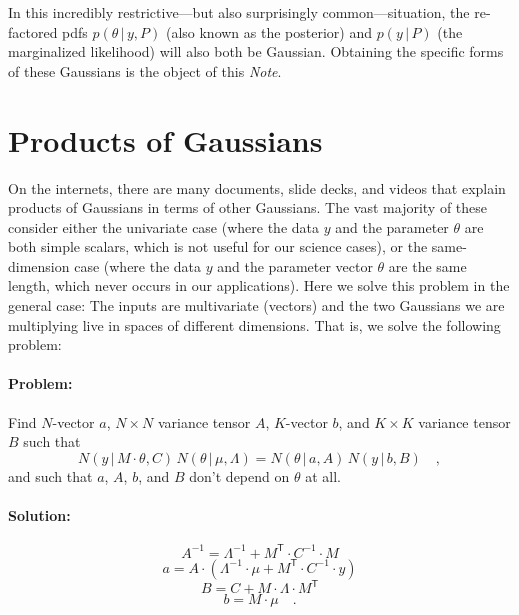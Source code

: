 \documentclass[12pt, letterpaper]{article}
\newcommand{\documentname}{\textsl{Note}}
\newcommand{\given}{\,|\,}
\newcommand{\T}{^{\!\mathsf{T}}}
\newcommand{\inv}{^{-1}}
\begin{document}
In this incredibly restrictive---but also surprisingly
common---situation, the re-factored pdfs $p(\theta\given y, P)$ (also
known as the posterior) and $p(y\given P)$ (the marginalized
likelihood) will also both be Gaussian.
Obtaining the specific forms of these Gaussians is the object of this
\documentname.

\section{Products of Gaussians}

On the internets, there are many documents, slide decks, and videos
that explain products of Gaussians in terms of other Gaussians.
The vast majority of these consider either the univariate case (where
the data $y$ and the parameter $\theta$ are both simple scalars, which
is not useful for our science cases), or the same-dimension case (where the data
$y$ and the parameter vector $\theta$ are the same length, which never
occurs in our applications).
Here we solve this problem in the general case:
The inputs are multivariate (vectors) and the two Gaussians we are
multiplying live in spaces of different dimensions.
That is, we solve the following problem:

\paragraph{Problem:}
Find $N$-vector $a$, $N\times N$ variance tensor $A$, $K$-vector $b$,
and $K\times K$ variance tensor $B$ such that
\begin{equation}
N(y\given M\cdot\theta, C)\,N(\theta\given\mu, \Lambda)
 = N(\theta\given a, A)\,N(y\given b, B) \quad ,
\end{equation}
and such that $a$, $A$, $b$, and $B$ don't depend on $\theta$ at all.

\paragraph{Solution:}
\begin{equation}
A\inv = \Lambda\inv + M\T \cdot C\inv \cdot M
\end{equation}
\begin{equation}
a = A \cdot (\Lambda\inv \cdot \mu + M\T \cdot C\inv \cdot y)
\end{equation}
\begin{equation}
B = C + M \cdot \Lambda \cdot M\T
\end{equation}
\begin{equation}
b = M \cdot \mu
\quad .
\end{equation}
\end{document}
